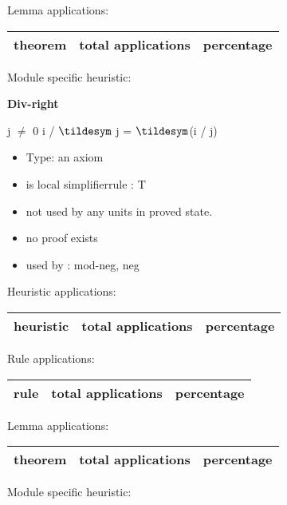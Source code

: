 \documentclass[a4paper]{article}
\begin{document}
Lemma applications:

\begin{supertabular}{l|r|r}
theorem	        & total applications & percentage \\ \hline

\end{supertabular}

Module specific heuristic:

\pagebreak

{\LARGE\bf Div-right}\label{lemma-Div-right}

\medskip

 \Fol j $\neq$ 0 \Imp i / $\tildesym$ j = $\tildesym$(i / j)

\begin{itemize}

\item Type: an axiom

\item is local simplifierrule : T
\item not used by any units in proved state.
\item       no proof exists
\item       used by      : mod-neg, neg
\end{itemize}

\medskip


Heuristic applications:

\begin{supertabular}{l|r|r}
heuristic	& total applications & percentage \\ \hline

\end{supertabular}

Rule applications:

\begin{supertabular}{l|r|r}
rule	        & total applications & percentage \\ \hline

\end{supertabular}

Lemma applications:

\begin{supertabular}{l|r|r}
theorem	        & total applications & percentage \\ \hline

\end{supertabular}

Module specific heuristic:

\pagebreak
\end{document}
